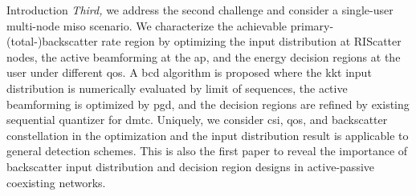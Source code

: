 \documentclass[journal]{IEEEtran}
\begin{document}
\begin{section}{Introduction}
	\emph{Third,} we address the second challenge and consider a single-user multi-node \gls{miso} scenario.
	We characterize the achievable primary-(total-)backscatter rate region by optimizing the input distribution at RIScatter nodes, the active beamforming at the \gls{ap}, and the energy decision regions at the user under different \gls{qos}.
	A \gls{bcd} algorithm is proposed where the \gls{kkt} input distribution is numerically evaluated by limit of sequences, the active beamforming is optimized by \gls{pgd}, and the decision regions are refined by existing sequential quantizer for \gls{dmtc}.
	Uniquely, we consider \gls{csi}, \gls{qos}, and backscatter constellation in the optimization and the input distribution result is applicable to general detection schemes.
	This is also the first paper to reveal the importance of backscatter input distribution and decision region designs in active-passive coexisting networks.



\end{section}
\end{document}
